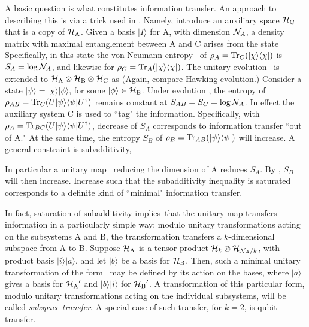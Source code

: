 A basic question is what constitutes information transfer.  An approach to describing this is via a trick used in \HaPr. Namely, introduce an auxiliary space ${{\cal H}_{\rm C}}$ that is a copy of ${{\cal H}_{\rm A}}$.  Given a basis $|I\rangle$ for A, with dimension ${\cal N}_A$, a density matrix with maximal entanglement between A and C arises from the state
% 
\eqn{}
% 
Specifically, in this state the von Neumann entropy \vN\ of $\rho_A={\rm Tr}_C(|\chi\rangle\langle\chi|)$ is $S_A=\log{\cal N}_A$, and likewise for $\rho_C={\rm Tr}_A(|\chi\rangle\langle\chi|)$.  The unitary evolution \transf\ is extended to ${{\cal H}_{\rm A}}\otimes {{\cal H}_{\rm B}}\otimes {{\cal H}_{\rm C}}$ as 
%
\eqn{}
%
(Again, compare Hawking evolution.) Consider a state $|\psi\rangle=|\chi\rangle |\phi \rangle$, for some $|\phi\rangle\in{{\cal H}_{\rm B}}$.  Under evolution \unitext, the entropy of $\rho_{AB}={\rm Tr}_C(U|\psi\rangle\langle\psi|U^\dagger)$ remains constant at $S_{AB}=S_C=\log{\cal N}_A$.  In effect the auxiliary system C is used to ``tag" the information.  Specifically, with $\rho_A={\rm Tr}_{BC}(U|\psi\rangle\langle\psi|U^\dagger)$, decrease of $S_A$ corresponds to information transfer ``out of A."  At the same time, the entropy $S_B$ of $\rho_B={\rm Tr}_{AB}(|\psi\rangle\langle\psi|)$ will increase.  A general constraint is subadditivity,
%
\eqn{}
%

In particular a unitary map \transf\ reducing the dimension of A reduces $S_A$.  By \subadd, $S_B$ will then increase.  Increase such that the subadditivity inequality is saturated corresponds to a definite kind of ``minimal" information transfer.

In fact, saturation of subadditivity implies\GiSh\ that the unitary map transfers information in a particularly simple way: modulo unitary transformations acting on the subsystems A and B, the transformation transfers a $k$-dimensional subspace from A to B.  Suppose ${{\cal H}_{\rm A}}$ is a tensor product ${\cal H}_k\otimes{\cal H}_{{\cal N}_A/k}$, with product basis $|i\rangle|a\rangle$, and let $|b\rangle$ be a basis for ${{\cal H}_{\rm B}}$.  Then, such a minimal unitary transformation of the form \transf\ may be defined by its action on the bases,
%
\eqn{}
%
where $|a\rangle$ gives a basis for ${{\cal H}_{\rm A}}'$ and $|b\rangle |i\rangle$ for ${{\cal H}_{\rm B}}'$.  A transformation of this particular form, modulo unitary transformations acting on the individual subsystems, will be called {\it subspace transfer}.  A special case of such transfer, for $k=2$, is qubit transfer.


